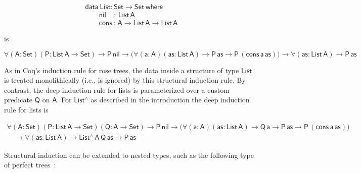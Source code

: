 \documentclass[9pt]{entcs}
\begin{document}
\vspace*{-0.1in}

\begin{equation*}\label{eq:list}
\begin{array}{l}
\mathsf{data\ List : Set \to Set\ where}\\
\mathsf{\;\;\;\;\;\;\;nil\,\,\,\,\,\; :\, List\,A}\\
\mathsf{\;\;\;\;\;\;\;cons\, :\, A \to List\,A \to List\,A} 
\end{array}
\end{equation*}

\vspace*{-0.1in}

\noindent
is

\vspace*{-0.2in}

\begin{equation*}
\mathsf{
\forall (A : Set) (P : List\,A \to Set)
\to P\,nil
\to \big( \forall (a : A) (as: List\,A)
\to P\,as
\to P\,(cons\,a\,as)\big)
\to \forall (as : List\,A)
\to P\, as
}
\end{equation*}

\vspace*{-0.1in}

\noindent
As in Coq's induction rule for rose trees, the data inside a structure
of type $\mathsf{List}$ is treated monolithically (i.e., is ignored)
by this structural induction rule.  By contrast, the deep induction
rule for lists is parameterized over a custom predicate $\mathsf{Q}$
on $\mathsf{A}$. For $\mathsf{List^\wedge}$ as described in the
introduction the deep induction rule for lists is

\vspace*{-0.2in}

\[\begin{array}{l}
\mathsf{\forall (A : Set) (P : List\, A \to Set) (Q : A \to Set)
\to P\,nil \to \big( \forall (a : A) (as: List\,A) \to Q\,a \to P\,as
\to P\,(cons\,a\,as)\big)} \\ 
\quad\mathsf{\to \forall (as : List\,A) \to List^{\wedge}\,A\,Q\,as
  \to P\,as } 
\end{array}\]

\vspace*{-0.1in}

Structural induction can be extended to nested types, such as the
following type of perfect trees~\cite{bm98}:

\pagebreak
\end{document}
